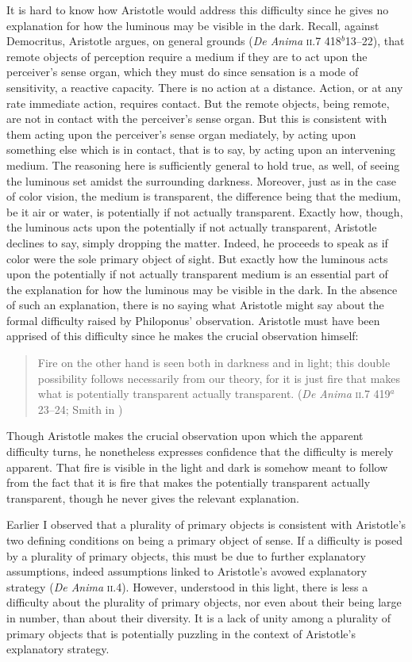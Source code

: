 It is hard to know how Aristotle would address this difficulty since he gives no explanation for how the luminous may be visible in the dark. Recall, against Democritus, Aristotle argues, on general grounds (\emph{De Anima} \textsc{ii}.7 418\( ^{b} \)13--22), that remote objects of perception require a medium if they are to act upon the perceiver's sense organ, which they must do since sensation is a mode of sensitivity, a reactive capacity. There is no action at a distance. Action, or at any rate immediate action, requires contact. But the remote objects, being remote, are not in contact with the perceiver's sense organ. But this is consistent with them acting upon the perceiver's sense organ mediately, by acting upon something else which is in contact, that is to say, by acting upon an intervening medium. The reasoning here is sufficiently general to hold true, as well, of seeing the luminous set amidst the surrounding darkness. Moreover, just as in the case of color vision, the medium is transparent, the difference being that the medium, be it air or water, is potentially if not actually transparent. Exactly how, though, the luminous acts upon the potentially if not actually transparent, Aristotle declines to say, simply dropping the matter. Indeed, he proceeds to speak as if color were the sole primary object of sight. But exactly how the luminous acts upon the potentially if not actually transparent medium is an essential part of the explanation for how the luminous may be visible in the dark. In the absence of such an explanation, there is no saying what Aristotle might say about the formal difficulty raised by Philoponus' observation. Aristotle must have been apprised of this difficulty since he makes the crucial observation himself:
\begin{quote}
	Fire on the other hand is seen both in darkness and in light; this double possibility follows necessarily from our theory, for it is just fire that makes what is potentially transparent actually transparent. (\emph{De Anima} \textsc{ii}.7 419\( ^{a} \)23--24; Smith in \citealt[34]{Barnes:1984uq})
\end{quote}
Though Aristotle makes the crucial observation upon which the apparent difficulty turns, he nonetheless expresses confidence that the difficulty is merely apparent. That fire is visible in the light and dark is somehow meant to follow from the fact that it is fire that makes the potentially transparent actually transparent, though he never gives the relevant explanation.

Earlier I observed that a plurality of primary objects is consistent with Aristotle's two defining conditions on being a primary object of sense. If a difficulty is posed by a plurality of primary objects, this must be due to further explanatory assumptions, indeed assumptions linked to Aristotle's avowed explanatory strategy (\emph{De Anima} \textsc{ii}.4). However, understood in this light, there is less a difficulty about the plurality of primary objects, nor even about their being large in number, than about their diversity. It is a lack of unity among a plurality of primary objects that is potentially puzzling in the context of Aristotle's explanatory strategy. 


